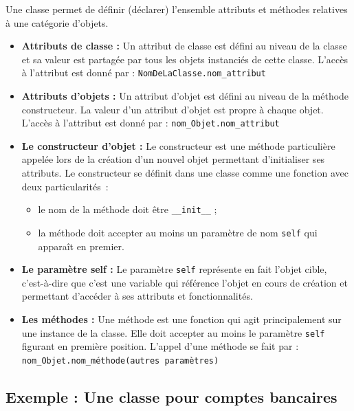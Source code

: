 \documentclass[a4paper,11pt]{article}
\theoremstyle{mytheor}
\begin{document}
Une classe permet de définir (déclarer) l'ensemble attributs et méthodes relatives à une catégorie d'objets.
\begin{itemize}
	\item \textbf{Attributs de classe :} Un attribut de classe est défini au niveau de la classe et sa valeur est partagée par tous les objets instanciés de cette classe. L'accès à l'attribut est donné par : \Verb!NomDeLaClasse.nom_attribut!
	
	\item \textbf{Attributs d'objets :} Un attribut d'objet est défini au niveau de la méthode constructeur. La valeur d'un attribut d'objet est propre à chaque objet. L'accès à l'attribut est donné par : \Verb!nom_Objet.nom_attribut!
	
	\item \textbf{Le constructeur d'objet :} Le constructeur est une méthode particulière appelée lors de la création d'un nouvel objet permettant d'initialiser ses attributs. Le constructeur se définit dans une classe comme une fonction avec deux particularités~:
	\begin{itemize}
		
		\item le nom de la méthode doit être \Verb!__init__! ;
		
		\item la méthode doit accepter au moins un paramètre de nom \texttt{self} qui apparaît en premier.
		
	\end{itemize}
	
	\noindent
	\item \textbf{Le paramètre self :} Le paramètre \texttt{self} représente en fait l'objet cible, c'est-à-dire que c'est une variable qui référence l'objet en cours de création et permettant d'accéder à ses attributs et fonctionnalités.
	
	\item \textbf{Les méthodes :} Une méthode est une fonction qui agit principalement sur une instance de la classe. Elle doit accepter au moins le paramètre \texttt{self} figurant en première position. L'appel d'une méthode se fait par : \Verb!nom_Objet.nom_méthode(autres paramètres)!
\end{itemize}

\noindent
\subsection{Exemple : Une classe pour comptes bancaires}
\end{document}
